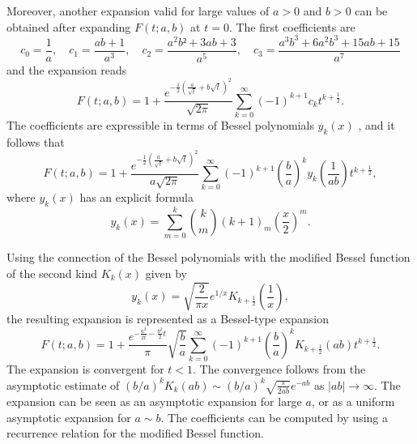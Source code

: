 \documentclass[10pt,a4paper,oneside]{article}
\DeclareMathOperator{\erfc}{erfc}
\numberwithin{equation}{section}
\begin{document}

Moreover, another expansion valid for large values of $a > 0$ and $b > 0$ can be obtained after expanding $F(t;a,b)$ at $t=0$. The first coefficients are
\begin{equation}
c_0 = \frac{1}{a}, \quad c_1 = \frac{ab + 1}{a^3}, \quad c_2 = \frac{a^2b² +3ab + 3}{a^5}, \quad c_3 = \frac{a^3b^3 + 6a^2b^3 + 15ab + 15}{a^7}
\end{equation}
and the expansion reads
\begin{equation}
F(t; a, b) = 1 + \frac{e^{-\frac{1}{2} \left(\frac{a}{\sqrt{t}} + b\sqrt{t} \right)^2}}{\sqrt{2\pi}}\sum_{k=0}^{\infty}(-1)^{k+1}c_k t^{k + \frac{1}{2}}.
\end{equation}
The coefficients are expressible in terms of Bessel polynomials $y_k(x)$ \cite[\S A001498]{OEIS}, and it follows that
\begin{equation}
F(t; a, b) = 1 + \frac{e^{-\frac{1}{2} \left(\frac{a}{\sqrt{t}} + b\sqrt{t} \right)^2}}{a\sqrt{2\pi}}\sum_{k=0}^{\infty}(-1)^{k+1} \left(\frac{b}{a}\right)^k y_k\left(\frac{1}{ab}\right) t^{k + \frac{1}{2}},
\end{equation}
where $y_k(x)$ has an explicit formula
\begin{equation}
y_k(x) = \sum_{m=0}^k \binom{k}{m} (k + 1)_m \left(\frac{x}{2}\right)^m.
\end{equation}

Using the connection of the Bessel polynomials with the modified Bessel function of the second kind $K_k(x)$ given by \cite[\S 33.1.3]{Temme2015}
\begin{equation}
y_k(x) = \sqrt{\frac{2}{\pi x}}e^{1/x} K_{k + \frac{1}{2}}\left(\frac{1}{x}\right),
\end{equation}
the resulting expansion is represented as a Bessel-type expansion
\begin{equation}\label{phi_expansion_besselk}
F(t; a, b) = 1 + \frac{e^{-\frac{a^2}{2t} - \frac{b^2}{2}t}}{\pi}\sqrt{\frac{b}{a}}\sum_{k=0}^{\infty} (-1)^{k+1} \left(\frac{b}{a}\right)^k K_{k + \frac{1}{2}}(ab)t^{k + \frac{1}{2}}.
\end{equation}
The expansion is convergent for $t < 1$. The convergence follows from the asymptotic estimate of $(b/a)^k K_k(ab) \sim (b/a)^k \sqrt{\frac{\pi}{2ab}}e^{-ab}$ as $|ab| \to \infty$. The expansion can be seen as an asymptotic expansion for large $a$, or as a uniform asymptotic expansion for $a \sim b$. The coefficients can be computed by using a recurrence relation for the modified Bessel function.
\end{document}
